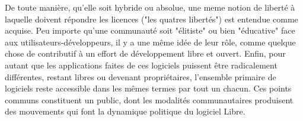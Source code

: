 De toute manière, qu'elle soit hybride ou absolue, une meme notion de liberté à laquelle doivent répondre les licences ("les quatres libertés") est entendue comme acquise. Peu importe qu'une communauté soit "élitiste" ou bien "éducative" face aux utilisateurs-développeurs, il y a une même idée de leur rôle, comme quelque chose de contributif à un effort de développement libre et ouvert. Enfin, pour autant que les applications faites de ces logiciels puissent être radicalement différentes, restant libres ou devenant propriétaires, l'ensemble primaire de logiciels reste accessible dans les mêmes termes par tout un chacun. Ces points communs constituent un public, dont les modalités communautaires produisent des mouvements qui font la dynamique politique du logiciel Libre.
